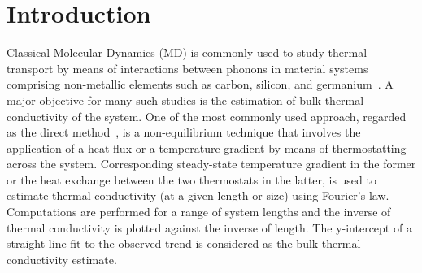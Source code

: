 \section{Introduction}
\label{sec:intro}

\begin{comment}
1. Background on use of MD simulations for thermal transport, preferred for studying
thermal transport by phononic interactions (refer notes from book suggested by Amuthan)


2. One approach to NEMD is the Direct Method, commonly used for estimating the bulk
thermal conductivity. A brief discussion on the direct method and associated pros and cons
(notes from Dellan's paper and book suggested by Amuthan) 
Predictions impacted by the choice of potential, values of
individual parameters, size, and potentially due to duration and applied thermal gradients
(cite Amuthan book, Francesco's paper, McGaughey's paper). 
Errors are introduced by thermostatting (Amuthan book). Nominal value of SW potential parameters based on fitting against experiments and to ensure structural stability etc. (SW paper)

3. Motivate uncertainty analysis and briefly discuss and cite recent efforts (Francesco, Kirby,
Murthy). Highlight focus and key contributions of the present work and how it differs from
those efforts. 

4. Section-wise overview of the paper.  
\end{comment}

Classical Molecular Dynamics (MD) is commonly used to study thermal transport by means of
interactions between phonons in material systems comprising non-metallic elements such
as carbon, silicon, and germanium~\cite{Dumitrica:2010}. 
A major objective for many such studies is the
estimation of bulk thermal conductivity of the system. One of the most commonly used approach,
regarded as the direct method~\cite{Schelling:2002,Turney:2009,Zhou:2009,Landry:2009,
McGaughey:2006,Ni:2009,Shi:2009,Wang:2009,Papanikolaou:2008}, is a non-equilibrium
technique that involves the application
of a heat flux or a temperature gradient by means of thermostatting across the system. 
Corresponding steady-state temperature gradient in the former or the heat exchange between
the two thermostats in the latter, is used to estimate thermal conductivity (at a given
length or size) using 
Fourier's law. Computations are performed for a range of system lengths and the inverse
of thermal conductivity is plotted against the inverse of length. The y-intercept of a
straight line fit to the observed trend is considered as the bulk thermal conductivity 
estimate. 

